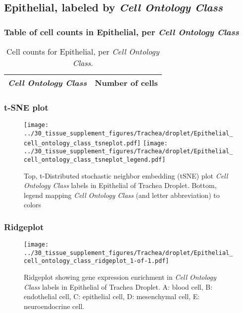 \clearpage

\subsection{Epithelial, labeled by \emph{Cell Ontology Class}}
\subsubsection{Table of cell counts in Epithelial, per \emph{Cell Ontology Class}}\begin{table}[h]
\centering
\label{my-label}
\begin{tabular}{@{}ll@{}}
\toprule

\emph{Cell Ontology Class}& Number of cells \\ \midrule\bottomrule
\end{tabular}
\caption{Cell counts for Epithelial, per \emph{Cell Ontology Class}.}
\end{table}

\clearpage
\subsubsection{t-SNE plot}
\begin{figure}[h]
\centering
\texttt{[image: ../30\_tissue\_supplement\_figures/Trachea/droplet/Epithelial\_cell\_ontology\_class\_tsneplot.pdf]}
\texttt{[image: ../30\_tissue\_supplement\_figures/Trachea/droplet/Epithelial\_cell\_ontology\_class\_tsneplot\_legend.pdf]}
\caption{Top, t-Distributed stochastic neighbor embedding (tSNE) plot  \emph{Cell Ontology Class} labels in Epithelial of Trachea Droplet. Bottom, legend mapping \emph{Cell Ontology Class} (and letter abbreviation) to colors}
\end{figure}


\clearpage

\subsubsection{Ridgeplot}
\begin{figure}[h]
\centering
\texttt{[image: ../30\_tissue\_supplement\_figures/Trachea/droplet/Epithelial\_cell\_ontology\_class\_ridgeplot\_1-of-1.pdf]}

\caption{ Ridgeplot  showing gene expression enrichment in \emph{Cell Ontology Class} labels in Epithelial of Trachea Droplet. A: blood cell, B: endothelial cell, C: epithelial cell, D: mesenchymal cell, E: neuroendocrine cell.}
\end{figure}


